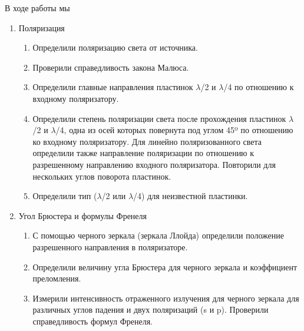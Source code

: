 \documentclass[a4paper, 12pt]{article}
\begin{document}
В ходе работы мы
\begin{enumerate}

	
	\item Поляризация

\begin{enumerate}


	\item Определили поляризацию света от источника.

	\item Проверили справедливость закона Малюса.

	\item Определили главные направления пластинок $\lambda$/2 и  $\lambda$/4 по отношению к входному поляризатору.

	\item Определили степень поляризации света после прохождения пластинок $\lambda$/2 и  $\lambda$/4, одна из осей которых повернута под углом 45º по отношению ко входному поляризатору. Для линейно поляризованного света определили также направление поляризации по отношению к разрешенному направлению входного поляризатора. Повторили для нескольких углов поворота пластинок.

	\item Определили тип ($\lambda$/2 или $\lambda$/4) для неизвестной пластинки.

\end{enumerate}

	\item Угол Брюстера и формулы Френеля

\begin{enumerate}

	\item С помощью черного зеркала (зеркала Ллойда) определили положение разрешенного направления в поляризаторе.

	\item Определили величину угла Брюстера для черного зеркала и коэффициент преломления.

	\item Измерили интенсивность отраженного излучения для черного зеркала для различных углов падения и двух поляризаций (s и p). Проверили справедливость формул Френеля. 

\end{enumerate}
\end{enumerate}
\end{document}

